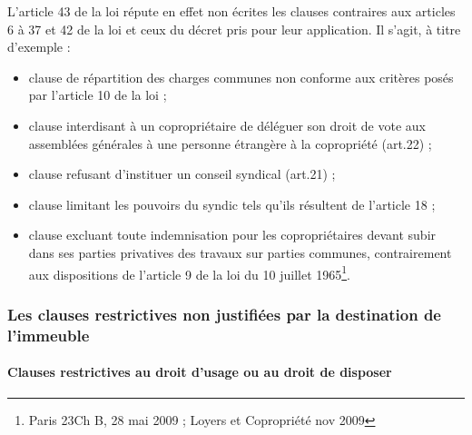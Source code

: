 			L'article 43 de la loi répute en effet non écrites les clauses contraires aux articles 6 à 37 et 42 de la loi et ceux du décret pris pour leur application. Il s'agit, à titre d'exemple :
			\begin{itemize}
				\item clause de répartition des charges communes non conforme aux critères posés par l'article 10 de la loi ;
				
				\item clause interdisant à un copropriétaire de déléguer son droit de vote aux assemblées générales à une personne étrangère à la copropriété (art.22) ;
				
				\item clause refusant d'instituer un conseil syndical (art.21) ;
				
				\item clause limitant les pouvoirs du syndic tels qu'ils résultent de l'article 18 ;
				
				\item clause excluant toute indemnisation pour les copropriétaires devant subir dans ses parties privatives des travaux sur parties communes, contrairement aux dispositions de l’article 9 de la loi du 10 juillet 1965\footnote{Paris 23\degres Ch B, 28 mai 2009 ; Loyers et Copropriété nov 2009 }.
			\end{itemize}
		
		\subsubsection{Les clauses restrictives non justifiées par la destination de l'immeuble}
		
			\paragraph{Clauses restrictives au droit d’usage ou au droit de disposer}
			

